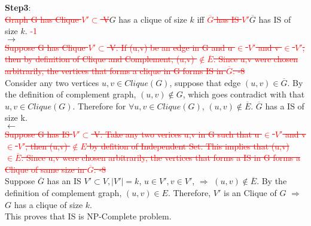\documentclass{article}%
\newcommand{\add}[1]{\textcolor{dkgreen}{#1}}
\newcommand{\rmv}[1]{\textcolor{red}{\sout{#1}}}
\begin{document}
\begin{flushleft}
\textbf{Step3}:\\
\rmv{Graph G has Clique $V' \subset$ V}\add{$G$ has a clique of size $k$} iff \rmv{$\overline{G}$ has IS $V'$}\add{$\overline{G}$ has IS of size $k$}.  \textcolor{red}{-1} \\
$\rightarrow$\\
\rmv{
Suppose G has Clique $V' \subset$ V. If (u,v) be an edge in G and u $\in$ $V'$ and v $\in$ $V'$, then by definition of Clique and Complement, (u,v) $\notin \overline{E}$. Since u,v were chosen arbitrarily, the vertices that forms a clique in G forms IS in $\overline{G}$. \textcolor{red}{-8}\\
}
\add{Consider any two vertices $u,v\in Clique(G)$, suppose that edge $(u,v)\in \overline{G}$. By the definition of complement graph, $(u,v)\notin G$, which goes contradict with that $u,v\in Clique(G)$. Therefore for $\forall u,v\in Clique(G)$, $(u,v)\notin \overline E$. $\overline G$ has a IS of size k.
}\\
$\leftarrow$\\

\rmv{
Suppose G has IS $V' \subset$ V.  Take any two verices u,v in G such that u $\in$ $V'$ and v $\in$ $V'$, then (u,v) $\notin {E}$ by defition of Independent Set. This implies that (u,v)  $\in \overline{E}$.  Since u,v were chosen arbitrarily, the vertices that forms a IS in G forms a Clique of same size in $\overline{G}$. \textcolor{red}{-8}\\
}
\add{
Suppose $\overline{G}$ has an IS $V' \subset V, |V'|=k$, $u \in V', v \in V'$, $\Rightarrow$ $(u,v) \notin \overline{E}$. By the definition of complement graph, $(u,v)\in E$. Therefore, $V'$ is an Clique of $G$ $\Rightarrow$ $G$ has a clique of size $k$.}\\
This proves that IS is NP-Complete problem.


\end{flushleft}
\end{document}
